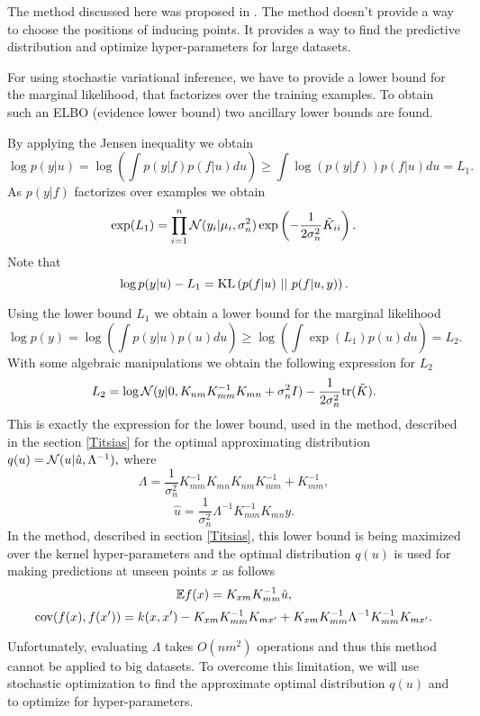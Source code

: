 \label{svi}

The method discussed here was proposed in \cite{BigData}. The method doesn't provide a way to choose the positions of inducing points. It provides a way to find the predictive distribution and optimize hyper-parameters for large datasets.

For using stochastic variational inference, we have to provide a lower bound for the marginal likelihood, that factorizes over the training examples. To obtain such an ELBO (evidence lower bound) two ancillary lower bounds are found. 

By applying the Jensen inequality we obtain
$$ \log p(y | u) = \log \left ( \int p(y|f) p(f | u) du\right) \ge  \int \log (p(y|f)) p(f | u) du = L_1.$$	
As $p(y | f)$ factorizes over examples we obtain
$$\exp(L_1) = \prod_{i = 1}^{n} \mathcal{N}(y_i| \mu_i, \sigma_n^2) \exp \left( -\frac 1 {2\sigma_n^2} \tilde K_{ii}\right).$$
Note that 
$$\log p(y | u) - L_1 = \mbox{KL}\left(p(f | u)\mbox{ || }p(f | u, y)\right).$$

Using the lower bound $L_1$ we obtain a lower bound for the marginal likelihood
$$\log p(y) = \log \left( \int p(y|u) p(u) du\right) \ge \log \left( \int \exp(L_1) p(u) du\right) = L_2.$$
With some algebraic manipulations we obtain the following expression for $L_2$
$$L_2 = \log \mathcal{N}(y| 0, K_{nm} K_{mm}^{-1} K_{mn} + \sigma_n^2 I) - \frac 1 {2 \sigma_n^2} \mbox{tr} (\tilde K).$$
This is exactly the expression for the lower bound, used in the method, described in the section \ref{Titsias} for the optimal approximating distribution $q(u) = \mathcal{N}(u |\hat u, \Lambda^{-1}),$ where
$$\Lambda = \frac 1 {\sigma_n^2} K_{mm}^{-1} K_{mn} K_{nm} K_{mm}^{-1} + K_{mm}^{-1},$$
$$\hat u = \frac 1 {\sigma_n^2} \Lambda^{-1} K_{mm}^{-1} K_{mn} y.$$
In the method, described in section \ref{Titsias}, this lower bound is being maximized over the kernel hyper-parameters and the optimal distribution $q(u)$ is used for making predictions at unseen points $x$ as follows
$$\mathbb{E} f(x) = K_{xm} K_{mm}^{-1} \hat u, $$
$$\mbox{cov}(f(x), f(x')) = k(x, x') - K_{xm} K_{mm}^{-1} K_{mx'} + K_{xm} K_{mm}^{-1} \Lambda^{-1} K_{mm}^{-1} K_{mx'}.$$

Unfortunately, evaluating $\Lambda$ takes $O(n m^2)$ operations and thus this method cannot be applied to big datasets. To overcome this limitation, we will use stochastic optimization to find the approximate optimal distribution $q(u)$ and to optimize for hyper-parameters. 

